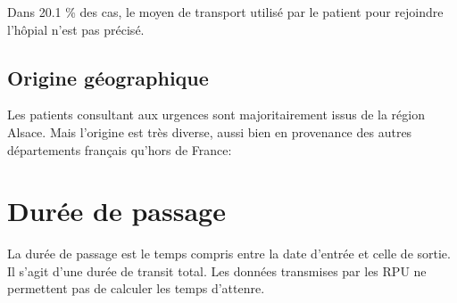 \documentclass[12pt,english,french,twoside]{report}\usepackage[]{graphicx}\usepackage[]{color}
\begin{document}
Dans 20.1 \% des cas, le moyen de transport utilisé par le patient pour rejoindre l'hôpial n'est pas précisé.

\section*{Origine géographique}



Les patients consultant aux urgences sont majoritairement issus de la région Alsace. Mais l'origine est très diverse, aussi bien en provenance des autres départements français qu'hors de France:



\chapter{Durée de passage}


La durée de passage est le temps compris entre la date d'entrée et celle de sortie. Il s'agit d'une durée de transit total. Les données transmises par les RPU ne permettent pas de calculer les temps d'attenre.
\end{document}
